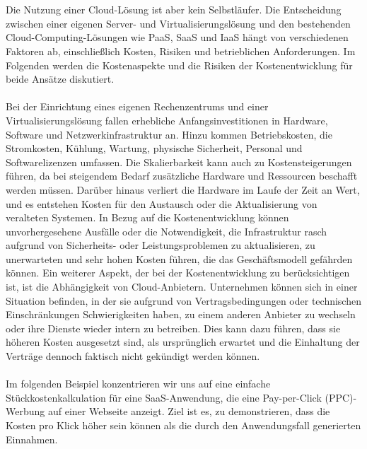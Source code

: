 \documentclass[../vs-script-first-v01.tex]{subfiles}
\begin{document}
\\\\
Die Nutzung einer Cloud-Lösung ist aber kein Selbstläufer. Die Entscheidung zwischen einer eigenen Server- und Virtualisierungslösung und den bestehenden Cloud-Computing-Lösungen wie PaaS, SaaS und IaaS hängt von verschiedenen Faktoren ab, einschließlich Kosten, Risiken und betrieblichen Anforderungen. Im Folgenden werden die Kostenaspekte und die Risiken der Kostenentwicklung für beide Ansätze diskutiert.
\\\\
Bei der Einrichtung eines eigenen Rechenzentrums und einer Virtualisierungslösung fallen erhebliche Anfangsinvestitionen in Hardware, Software und Netzwerkinfrastruktur an. Hinzu kommen Betriebskosten, die Stromkosten, Kühlung, Wartung, physische Sicherheit, Personal und Softwarelizenzen umfassen. Die Skalierbarkeit kann auch zu Kostensteigerungen führen, da bei steigendem Bedarf zusätzliche Hardware und Ressourcen beschafft werden müssen. Darüber hinaus verliert die Hardware im Laufe der Zeit an Wert, und es entstehen Kosten für den Austausch oder die Aktualisierung von veralteten Systemen. In Bezug auf die Kostenentwicklung können unvorhergesehene Ausfälle oder die Notwendigkeit, die Infrastruktur rasch aufgrund von Sicherheits- oder Leistungsproblemen zu aktualisieren, zu unerwarteten und sehr hohen Kosten führen, die das Geschäftsmodell gefährden können.
Ein weiterer Aspekt, der bei der Kostenentwicklung zu berücksichtigen ist, ist die Abhängigkeit von Cloud-Anbietern. Unternehmen können sich in einer Situation befinden, in der sie aufgrund von Vertragsbedingungen oder technischen Einschränkungen Schwierigkeiten haben, zu einem anderen Anbieter zu wechseln oder ihre Dienste wieder intern zu betreiben. Dies kann dazu führen, dass sie höheren Kosten ausgesetzt sind, als ursprünglich erwartet und die Einhaltung der Verträge dennoch faktisch nicht gekündigt werden können.
\\\\
Im folgenden Beispiel konzentrieren wir uns auf eine einfache Stückkostenkalkulation für eine SaaS-Anwendung, die eine Pay-per-Click (PPC)-Werbung auf einer Webseite anzeigt. Ziel ist es, zu demonstrieren, dass die Kosten pro Klick höher sein können als die durch den Anwendungsfall generierten Einnahmen.
\end{document}
